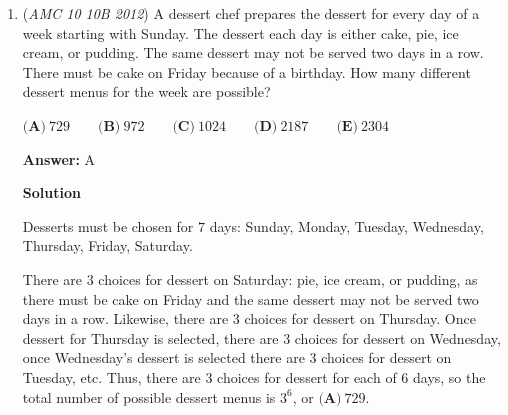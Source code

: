 \begin{enumerate}
Cross-multiplying gives $MN=36.$ We write $36$ as a product of two positive integers:
 \begin{align*} 36 &= 1\cdot36 \\ &= 2\cdot18 \\ &= 3\cdot12 \\ &= 4\cdot9 \\ &= 6\cdot6. \end{align*}
The products $1\cdot36, 2\cdot18, 3\cdot12,$ and $4\cdot9$ each produce $2$ ordered pairs $(M,N),$ as we can switch the order of the factors. The product $6\cdot6$ produces $1$ ordered pair $(M,N).$ Together, we have $4\cdot2+1=\boxed{\textbf{(D)}\ 9}$ ordered pairs $(M,N).$




\textbf{Solution 2}

Cross-multiplying gives $MN=36.$ From the prime factorization 
 \[36=2^2\cdot3^2,\] we conclude that $36$ has $(2+1)(2+1)=9$ positive divisors. There are $9$ values of $M,$ and each value generates $1$ ordered pair $(M,N).$ So, there are $\boxed{\textbf{(D)}\ 9}$ ordered pairs $(M,N)$ in total.

 


	\item (\textit{AMC 10 10B 2012}) A dessert chef prepares the dessert for every day of a week starting with Sunday. The dessert each day is either cake, pie, ice cream, or pudding. The same dessert may not be served two days in a row. There must be cake on Friday because of a birthday. How many different dessert menus for the week are possible?


 $\textbf{(A)}\ 729\qquad\textbf{(B)}\ 972\qquad\textbf{(C)}\ 1024\qquad\textbf{(D)}\ 2187\qquad\textbf{(E)}\ 2304$

 \textbf{Answer: }A



\textbf{Solution}

Desserts must be chosen for $7$ days: Sunday, Monday, Tuesday, Wednesday, Thursday, Friday, Saturday. 

 There are $3$ choices for dessert on Saturday: pie, ice cream, or pudding, as there must be cake on Friday and the same dessert may not be served two days in a row. Likewise, there are $3$ choices for dessert on Thursday. Once dessert for Thursday is selected, there are $3$ choices for dessert on Wednesday, once Wednesday's dessert is selected there are $3$ choices for dessert on Tuesday, etc. Thus, there are $3$ choices for dessert for each of $6$ days, so the total number of possible dessert menus is $3^6$, or $\boxed{\textbf{(A)}\ 729}$.


\end{enumerate}
